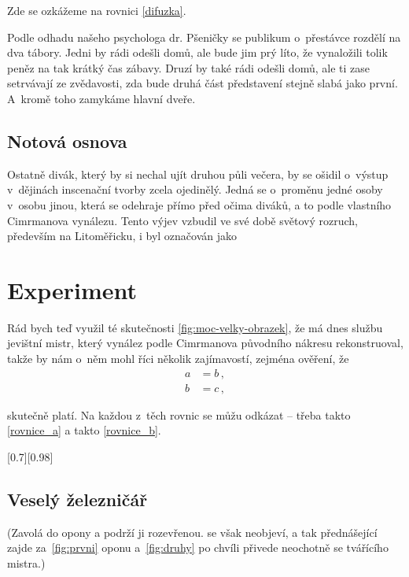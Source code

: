 \documentclass{cygclanek}
\begin{document}
Zde se ozkážeme na rovnici \eqref{difuzka}. 

Podle odhadu našeho psychologa
dr. Pšeničky se publikum o~přestávce rozdělí na dva tábory. Jedni by rádi
odešli domů, ale bude jim prý líto, že vynaložili tolik peněz na tak krátký čas
zábavy. Druzí by také rádi odešli domů, ale ti zase setrvávají ze zvědavosti,
zda bude druhá část představení stejně slabá jako první. A~kromě toho zamykáme
hlavní dveře.


\subsection{Notová osnova}
Ostatně divák, který by si nechal ujít druhou půli večera, by se ošidil
o~výstup v~dějinách inscenační tvorby zcela ojedinělý. Jedná se o~proměnu jedné
osoby v~osobu jinou, která se odehraje přímo před očima diváků, a to podle
vlastního Cimrmanova vynálezu. Tento výjev vzbudil ve své době světový rozruch,
především na Litoměřicku, i byl označován jako 


\section{Experiment}
Rád bych teď využil té skutečnosti \ref{fig:moc-velky-obrazek}, že má dnes
službu jevištní mistr, který vynález podle Cimrmanova původního nákresu
rekonstruoval, takže by nám o~něm mohl říci několik zajímavostí, zejména
ověření, že 
\begin{align}
  a &= b \label{rovnice_a} \,,\\
  b &= c \label{rovnice_b} \,,
\end{align}

skutečně platí. Na každou z~těch rovnic se můžu odkázat -- třeba takto
\eqref{rovnice_a} a takto \eqref{rovnice_b}.



[0.7][0.98]



\subsection{Veselý železničář}
(Zavolá do opony a podrží ji rozevřenou.  se však neobjeví, a tak přednášející zajde za~\ref{fig:prvni} oponu a~\ref{fig:druhy} po chvíli přivede neochotně se tvářícího mistra.)
\end{document}
